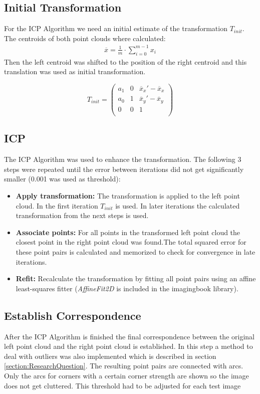 \subsection{Initial Transformation}
For the ICP Algorithm we need an initial estimate of the transformation $T_{init}$. The centroids of both point clouds where calculated:
\begin{align}
	\overline{x} = \frac{1}{m} \cdot \sum_{i=0}^{m-1} x_i
\end{align}
Then the left centroid was shifted to the position of the right centroid and this translation was used as initial transformation.

\begin{equation}
	T_{init} = 
	\begin{pmatrix}
		a_{1} & 0 & \overline{x}_x' - \overline{x}_x \\
		a_{0} & 1 & \overline{x}_y' - \overline{x}_y \\
		0 & 0 & 1 \\
	\end{pmatrix} 
\end{equation}

\subsection{ICP}
The ICP Algorithm was used to enhance the transformation. The following 3 steps were repeated until the error between iterations did not get significantly smaller (0.001 was used as threshold):
\begin{itemize}
	\item \textbf{Apply transformation:} The transformation is applied to the left point cloud. In the first iteration $T_{init}$ is used. In later iterations the calculated transformation from the next steps is used.
	\item \textbf{Associate points:} For all points in the transformed left point cloud the closest point in the right point cloud was found.The total squared error for these point pairs is calculated and memorized to check for convergence in late iterations.
	\item \textbf{Refit:} Recalculate the transformation by fitting all point pairs using an affine least-squares fitter (\textit{AffineFit2D} is included in the imagingbook library).
\end{itemize}

\subsection{Establish Correspondence}
\label{section:Correspondence}
After the ICP Algorithm is finished the final correspondence between the original left point cloud and the right point cloud is established. In this step a method to deal with outliers was also implemented which is described in section \ref{section:ResearchQuestion}. The resulting point pairs are connected with arcs. Only the arcs for corners with a certain corner strength are shown so the image does not get cluttered. This threshold had to be adjusted for each test image

